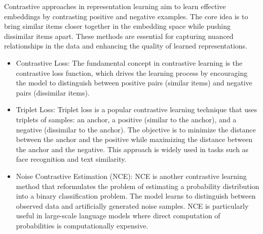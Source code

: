 Contrastive approaches in representation learning aim to learn effective embeddings by contrasting positive and negative examples. The core idea is to bring similar items closer together in the embedding space while pushing dissimilar items apart. These methods are essential for capturing nuanced relationships in the data and enhancing the quality of learned representations.
\begin{itemize}
  \item Contrastive Loss: The fundamental concept in contrastive learning is the contrastive loss function, which drives the learning process by encouraging the model to distinguish between positive pairs (similar items) and negative pairs (dissimilar items).
  \item Triplet Loss: Triplet loss is a popular contrastive learning technique that uses triplets of samples: an anchor, a positive (similar to the anchor), and a negative (dissimilar to the anchor). The objective is to minimize the distance between the anchor and the positive while maximizing the distance between the anchor and the negative. This approach is widely used in tasks such as face recognition and text similarity.
  \item 
  Noise Contrastive Estimation (NCE): NCE is another contrastive learning method that reformulates the problem of estimating a probability distribution into a binary classification problem. The model learns to distinguish between observed data and artificially generated noise samples. NCE is particularly useful in large-scale language models where direct computation of probabilities is computationally expensive.
\end{itemize}